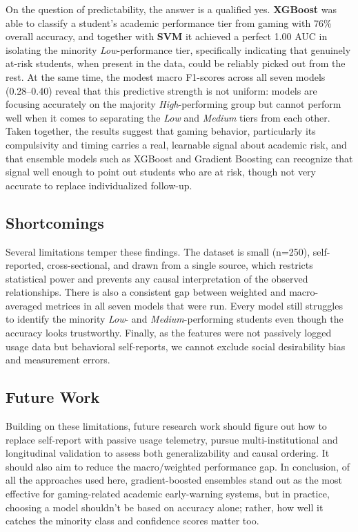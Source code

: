 \documentclass[conference]{IEEEtran}
\begin{document}
On the question of predictability, the answer is a qualified yes. \textbf{XGBoost} was able to classify a student's academic performance tier from gaming with 76\% overall accuracy, and together with \textbf{SVM} it achieved a perfect 1.00 AUC in isolating the minority \textit{Low}-performance tier, specifically indicating that genuinely at-risk students, when present in the data, could be reliably picked out from the rest. At the same time, the modest macro F1-scores across all seven models (0.28--0.40) reveal that this predictive strength is not uniform: models are focusing accurately on the majority \textit{High}-performing group but cannot perform well when it comes to separating the \textit{Low} and \textit{Medium} tiers from each other. Taken together, the results suggest that gaming behavior, particularly its compulsivity and timing carries a real, learnable signal about academic risk, and that ensemble models such as XGBoost and Gradient Boosting can recognize that signal well enough to point out students who are at risk, though not very accurate to replace individualized follow-up. 

\subsection{Shortcomings}
Several limitations temper these findings. The dataset is small (n=250), self-reported, cross-sectional, and drawn from a single source, which restricts statistical power and prevents any causal interpretation of the observed relationships. There is also a consistent gap between weighted and macro-averaged metrices in all seven models that were run. Every model still struggles to identify the minority \textit{Low}- and \textit{Medium}-performing students even though the accuracy looks trustworthy. Finally, as the features were not passively logged usage data but behavioral self-reports, we cannot exclude social desirability bias and measurement errors.

\subsection{Future Work}
Building on these limitations, future research work should figure out how to replace self-report with passive usage telemetry, pursue multi-institutional and longitudinal validation to assess both generalizability and causal ordering. It should also aim to reduce the macro/weighted performance gap. In conclusion, of all the approaches used here, gradient-boosted ensembles stand out as the most effective for gaming-related academic early-warning systems, but in practice, choosing a model shouldn't be based on accuracy alone; rather, how well it catches the minority class and confidence scores matter too.  
\end{document}
